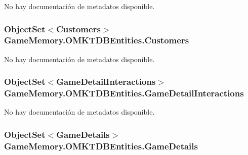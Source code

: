 No hay documentación de metadatos disponible. 

\hypertarget{class_game_memory_1_1_o_m_k_t_d_b_entities_a4792b11f4a6d49c5ff63ee8f9ebfae2b}{
\subsubsection[{Customers}]{\setlength{\rightskip}{0pt plus 5cm}Object\-Set$<${\bf Customers}$>$ Game\-Memory.\-O\-M\-K\-T\-D\-B\-Entities.\-Customers\hspace{0.3cm}{\ttfamily [get]}}}\label{class_game_memory_1_1_o_m_k_t_d_b_entities_a4792b11f4a6d49c5ff63ee8f9ebfae2b}


No hay documentación de metadatos disponible. 

\hypertarget{class_game_memory_1_1_o_m_k_t_d_b_entities_a1a8d11e4033053188744d00ca1cf9f2a}{
\subsubsection[{Game\-Detail\-Interactions}]{\setlength{\rightskip}{0pt plus 5cm}Object\-Set$<${\bf Game\-Detail\-Interactions}$>$ Game\-Memory.\-O\-M\-K\-T\-D\-B\-Entities.\-Game\-Detail\-Interactions\hspace{0.3cm}{\ttfamily [get]}}}\label{class_game_memory_1_1_o_m_k_t_d_b_entities_a1a8d11e4033053188744d00ca1cf9f2a}


No hay documentación de metadatos disponible. 

\hypertarget{class_game_memory_1_1_o_m_k_t_d_b_entities_af835cabeefdbea910bd796314d96732a}{
\subsubsection[{Game\-Details}]{\setlength{\rightskip}{0pt plus 5cm}Object\-Set$<${\bf Game\-Details}$>$ Game\-Memory.\-O\-M\-K\-T\-D\-B\-Entities.\-Game\-Details\hspace{0.3cm}{\ttfamily [get]}}}\label{class_game_memory_1_1_o_m_k_t_d_b_entities_af835cabeefdbea910bd796314d96732a}


